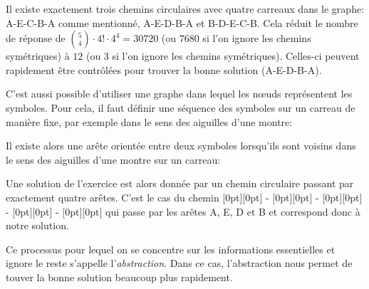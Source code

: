 \documentclass[a4paper,11pt]{report}
\newcommand{\taskGraphicsFolder}{..}
\begin{document}
Il existe exactement trois chemins circulaires avec quatre carreaux dans le graphe: A-E-C-B-A comme mentionné, A-E-D-B-A et B-D-E-C-B. Cela réduit le nombre de réponse de ${{5 \choose 4}  \cdot 4! \cdot 4 ^ 4 = 30720}$ (ou ${7680}$ si l’on ignore les chemins symétriques) à ${12}$ (ou ${3}$ si l’on ignore les chemins symétriques). Celles-ci peuvent rapidement être contrôlées pour trouver la bonne solution (A-E-D-B-A).

C’est aussi possible d’utiliser une graphe dans lequel les nœuds représentent les symboles. Pour cela, il faut définir une séquence des symboles sur un carreau de manière fixe, par exemple dans le sens des aiguilles d’une montre:

{\centering%
\par}

Il existe alors une arête orientée entre deux symboles lorsqu’ils sont voisins dans le sens des aiguilles d’une montre sur un carreau:

{\centering%
\par}

Une solution de l’exercice est alors donnée par un chemin circulaire passant par exactement quatre arêtes. C’est le cas du chemin \raisebox{\dimexpr -0.5ex +0.4ex \relax}[0pt][0pt]{} - \raisebox{\dimexpr -0.5ex +0.4ex \relax}[0pt][0pt]{} - \raisebox{\dimexpr -0.5ex +0.4ex \relax}[0pt][0pt]{} - \raisebox{-0.5ex}[0pt][0pt]{} - \raisebox{\dimexpr -0.5ex +0.4ex \relax}[0pt][0pt]{} qui passe par les arêtes A, E, D et B et correspond donc à notre solution.

Ce processus pour lequel on se concentre sur les informations essentielles et ignore le reste s’appelle l’\emph{abstraction}. Dans ce cas, l’abstraction nous permet de touver la bonne solution beaucoup plus rapidement.
\end{document}
